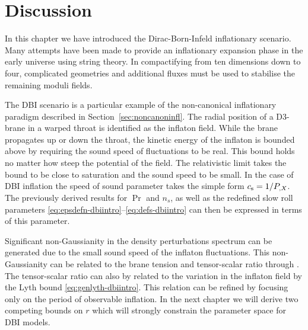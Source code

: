 \section{Discussion}
\label{sec:summary-dbiintro}
In this chapter we have introduced the Dirac-Born-Infeld inflationary scenario.
Many attempts have been made to provide an inflationary expansion phase in the
early universe using string theory. In compactifying from ten dimensions down to
four,
complicated geometries and additional fluxes must be used to stabilise the
remaining moduli fields. 

The DBI scenario 
is a particular example of the non-canonical inflationary para\-digm described in
Section~\ref{sec:noncanoninfl}. 
The radial position of a D3-brane in a warped throat is identified as the inflaton field. While the
brane propagates up or down the throat, the kinetic energy of the inflaton is bounded
above by requiring
the sound speed of fluctuations to be real. This bound holds no matter how steep the potential of
the field. The relativistic limit takes the bound to be close to saturation and the sound speed to
be small.
% 
In the case of DBI inflation the speed of sound
parameter
takes the simple form $c_\mathrm{s} = 1/P_{,X}$. The previously derived
results for $\Pr$ and $n_s$, as well as the redefined slow roll parameters 
\eqref{eq:epsdefn-dbiintro}--\eqref{eq:defs-dbiintro} can then be expressed in terms
of this parameter. 

Significant non-Gaussianity in the density perturbations spectrum can be generated
due to the small sound speed of the inflaton fluctuations.
This non-Gaussianity can be related to the brane tension and tensor-scalar ratio
through . The tensor-scalar ratio can also by related to the variation in
the inflaton field by the Lyth bound \eqref{eq:genlyth-dbiintro}. This relation can be refined by
focusing only on the period of observable inflation. 
% 
In the next chapter we will derive two
competing bounds on $r$ which will strongly constrain the parameter space for
DBI models.


